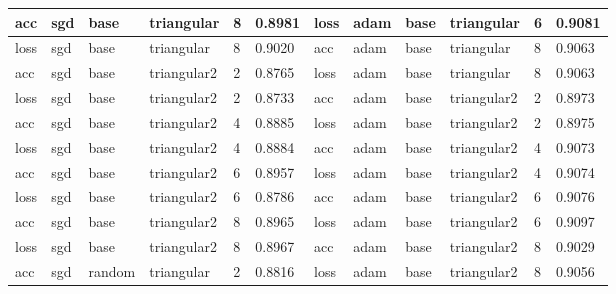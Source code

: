 \begin{table}[H]
\begin{adjustbox}{width=1\textwidth}
\begin{tabular}{|l|l|l|l|l|l||l|l|l|l|l|l|}
acc           & sgd          & base          & triangular       & 8             & 0.8981            & loss          & adam         & base          & triangular       & 6             & 0.9081            \\ \hline
loss          & sgd          & base          & triangular       & 8             & 0.9020            & acc           & adam         & base          & triangular       & 8             & 0.9063            \\ \hline
acc           & sgd          & base          & triangular2      & 2             & 0.8765            & loss          & adam         & base          & triangular       & 8             & 0.9063            \\ \hline
loss          & sgd          & base          & triangular2      & 2             & 0.8733            & acc           & adam         & base          & triangular2      & 2             & 0.8973            \\ \hline
acc           & sgd          & base          & triangular2      & 4             & 0.8885            & loss          & adam         & base          & triangular2      & 2             & 0.8975            \\ \hline
loss          & sgd          & base          & triangular2      & 4             & 0.8884            & acc           & adam         & base          & triangular2      & 4             & 0.9073            \\ \hline
acc           & sgd          & base          & triangular2      & 6             & 0.8957            & loss          & adam         & base          & triangular2      & 4             & 0.9074            \\ \hline
loss          & sgd          & base          & triangular2      & 6             & 0.8786            & acc           & adam         & base          & triangular2      & 6             & 0.9076            \\ \hline
acc           & sgd          & base          & triangular2      & 8             & 0.8965            & loss          & adam         & base          & triangular2      & 6             & 0.9097            \\ \hline
loss          & sgd          & base          & triangular2      & 8             & 0.8967            & acc           & adam         & base          & triangular2      & 8             & 0.9029            \\ \hline
acc           & sgd          & random        & triangular       & 2             & 0.8816            & loss          & adam         & base          & triangular2      & 8             & 0.9056            \\ \hline

\end{tabular}
\end{adjustbox}
\end{table}
